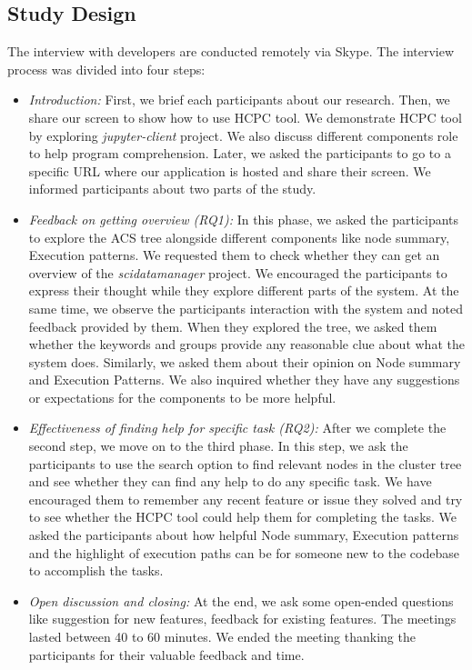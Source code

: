 \subsection{Study Design}
The interview with developers are conducted remotely via Skype. The interview process was divided into four steps:
\begin{itemize}
    \item \emph{Introduction:} First, we brief each participants about our research. Then, we share our screen to show how to use HCPC tool. We demonstrate HCPC tool by exploring \emph{jupyter-client} project. We also discuss different components role to help program comprehension. Later, we asked the participants to go to a specific URL where our application is hosted and share their screen. We informed participants about two parts of the study.   
    \item \emph{Feedback on getting overview (RQ1):} In this phase, we asked the participants to explore the ACS tree alongside different components like node summary, Execution patterns. We requested them to check whether they can get an  overview of the \emph{scidatamanager} project. We encouraged the participants to express their thought while they explore different parts of the system. At the same time, we observe the participants interaction with the system and noted feedback provided by them. When they explored the tree, we asked them whether the keywords and groups provide any reasonable clue about what the system does. Similarly, we asked them about their opinion on Node summary and Execution Patterns. We also inquired whether they have any suggestions or expectations for the components to be more helpful.
    
    
    \item \emph{Effectiveness of finding help for specific task (RQ2):} After we complete the second step, we move on to the third phase. In this step, we ask the participants to use the search option to find relevant nodes in the cluster tree and see whether they can find any help to do any specific task. We have encouraged them to remember any recent feature or issue they solved and try to see whether the HCPC tool could help them for completing the tasks. We asked the participants about how helpful Node summary, Execution patterns and the highlight of execution paths can be for someone new to the codebase to accomplish the tasks.
    \item \emph{Open discussion and closing:} At the end, we ask some open-ended questions like suggestion for new features, feedback for existing features. The meetings lasted between 40 to 60 minutes. We ended the meeting thanking the participants for their valuable feedback and time.

\end{itemize}
